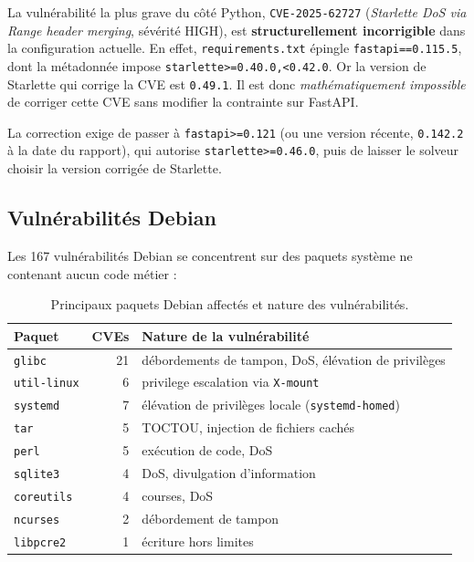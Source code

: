 \documentclass[11pt,a4paper]{report}
\begin{document}
\begin{alerte}
La vulnérabilité la plus grave du côté Python,
\texttt{CVE-2025-62727} (\emph{Starlette DoS via Range header merging},
sévérité HIGH), est \textbf{structurellement incorrigible} dans la
configuration actuelle. En effet, \texttt{requirements.txt} épingle
\texttt{fastapi==0.115.5}, dont la métadonnée impose
\texttt{starlette>=0.40.0,<0.42.0}. Or la version de Starlette qui corrige
la CVE est \texttt{0.49.1}. Il est donc \emph{mathématiquement impossible}
de corriger cette CVE sans modifier la contrainte sur FastAPI.

La correction exige de passer à \texttt{fastapi>=0.121} (ou une version
récente, \texttt{0.142.2} à la date du rapport), qui autorise
\texttt{starlette>=0.46.0}, puis de laisser le solveur choisir la version
corrigée de Starlette.
\end{alerte}

\subsection{Vulnérabilités Debian}

Les 167 vulnérabilités Debian se concentrent sur des paquets système
ne contenant aucun code métier :

\begin{table}[H]
\centering\small
\begin{tabular}{@{}p{3.6cm}r p{8.0cm}@{}}
\toprule
\textbf{Paquet} & \textbf{CVEs} & \textbf{Nature de la vulnérabilité} \\
\midrule
\texttt{glibc}       & 21 & débordements de tampon, DoS, élévation de privilèges \\
\texttt{util-linux}  & 6  & privilege escalation via \texttt{X-mount} \\
\texttt{systemd}     & 7  & élévation de privilèges locale (\texttt{systemd-homed}) \\
\texttt{tar}         & 5  & TOCTOU, injection de fichiers cachés \\
\texttt{perl}        & 5  & exécution de code, DoS \\
\texttt{sqlite3}     & 4  & DoS, divulgation d'information \\
\texttt{coreutils}   & 4  & courses, DoS \\
\texttt{ncurses}     & 2  & débordement de tampon \\
\texttt{libpcre2}    & 1  & écriture hors limites \\
\bottomrule
\end{tabular}
\caption{Principaux paquets Debian affectés et nature des vulnérabilités.}
\end{table}
\end{document}
